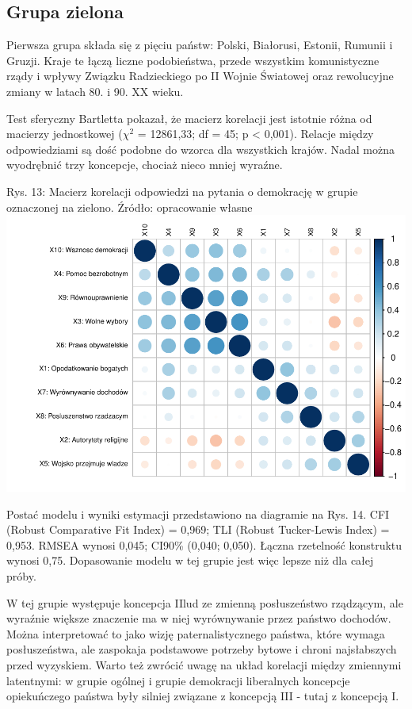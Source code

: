 \documentclass[12pt]{article}
\begin{document}
\hypertarget{grupa-zielona}{%
\subsection{Grupa zielona}\label{grupa-zielona}}

Pierwsza grupa składa się z pięciu państw: Polski, Białorusi, Estonii, Rumunii i Gruzji. Kraje te łączą liczne podobieństwa, przede wszystkim komunistyczne rządy i wpływy Związku Radzieckiego po II Wojnie Światowej oraz rewolucyjne zmiany w latach 80. i 90. XX wieku.

Test sferyczny Bartletta pokazał, że macierz korelacji jest istotnie różna od macierzy jednostkowej (\(\chi^2\) = 12861,33; df = 45; p \textless{} 0,001). Relacje między odpowiedziami są dość podobne do wzorca dla wszystkich krajów. Nadal można wyodrębnić trzy koncepcje, chociaż nieco mniej wyraźne.

Rys. 13: Macierz korelacji odpowiedzi na pytania o demokrację w grupie oznaczonej na zielono. Źródło: opracowanie własne
\includegraphics{text_ASA_files/figure-latex/cor-matrix-1-1.pdf}

Postać modelu i wyniki estymacji przedstawiono na diagramie na Rys. 14. CFI (Robust Comparative Fit Index) = 0,969; TLI (Robust Tucker-Lewis Index) = 0,953. RMSEA wynosi 0,045; CI90\% (0,040; 0,050). Łączna rzetelność konstruktu wynosi 0,75. Dopasowanie modelu w tej grupie jest więc lepsze niż dla całej próby.

W tej grupie występuje koncepcja IIlud ze zmienną posłuszeństwo rządzącym, ale wyraźnie większe znaczenie ma w niej wyrównywanie przez państwo dochodów. Można interpretować to jako wizję paternalistycznego państwa, które wymaga posłuszeństwa, ale zaspokaja podstawowe potrzeby bytowe i chroni najsłabszych przed wyzyskiem. Warto też zwrócić uwagę na układ korelacji między zmiennymi latentnymi: w grupie ogólnej i grupie demokracji liberalnych koncepcje opiekuńczego państwa były silniej związane z koncepcją III - tutaj z koncepcją I.
\end{document}
